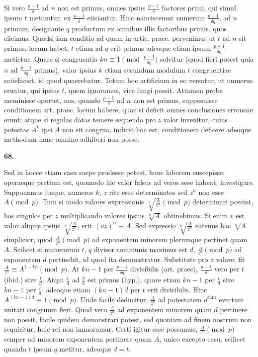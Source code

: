 \documentclass[12pt,a4paper]{article}
\theoremstyle{plain}
\theoremstyle{definition}
\theoremstyle{remark}
\begin{document}
Si vero $\frac{p-1}{\delta}$ ad $n$ non est primus, omnes ipsius $\frac{p-1}{\delta}$ factores primi, qui simul ipsum $t$ metiuntur, ex $\frac{p-1}{\delta}$ eiiciantur. Hinc nanciscemur numerum $\frac{p-1}{\delta q}$, ad $n$ primum, designante $q$ productum ex omnibus illis factoribus primis, quos eiicimus. Quodsi iam conditio ad quam in artic. praec. pervenimus ut $t$ ad $n$ sit primus, locum habet, $t$ etiam ad $q$ erit primus adeoque etiam ipsum $\frac{p-1}{\delta q}$ metietur. Quare si congruentia $kn \equiv 1 \pmod{\frac{p-1}{\delta q}}$ solvitur (quod fieri potest quia $n$ ad $\frac{p-1}{\delta q}$ primus), valor ipsius $k$ etiam secundum modulum $t$ congruentiae satisfaciet, id quod quaerebatur. Totum hoc artificium in eo versatur, ut numerus eruatur, qui ipsius $t$, quem ignoramus, vice fungi possit. Attamen probe meminisse oportet, nos, quando $\frac{p-1}{\delta}$ ad $n$ non est primus, supposuisse conditionem art. praec. locum habere, quae si deficit omnes conclusiones erroneae erunt; atque si regulas datas temere sequendo pro $z$ valor invenitur, cuius potestas $A^k$ ipsi $A$ non sit congrua, indicio hoc est, conditionem deficere adeoque methodum hanc omnino adhiberi non posse.

\setcounter{satz}{68}
\addtocounter{satz}{-1}
\textbf{68.}

Sed in hocce etiam casu saepe prodesse potest, hunc laborem suscepisse; operaeque pretium est, quomodo hic valor falsus ad veros sese habeat, investigare. Supponamus itaque, numeros $k$, $z$ rite esse determinatos sed $z^n$ non esse $A \pmod{p}$. Tum si modo valores expressionis $\sqrt[n]{\frac{A}{z^n}} \pmod{p}$ determinari possint, hos singulos per $z$ multiplicando valores ipsius $\sqrt[n]{A}$ obtinebimus. Si enim $v$ est valor aliquis ipsius $\sqrt[n]{\frac{A}{z^n}}$, erit $(vz)^n \equiv A$. Sed expressio $\sqrt[n]{\frac{A}{z^n}}$ eatenus hac $\sqrt[n]{A}$ simplicior, quod $\frac{A}{z^n} \pmod{p}$ ad exponentem minorem plerumque pertinet quam $A$. Scilicet si numerorum $t$, $q$ divisor communis maximus est $d$, $\frac{A}{z^n} \pmod{p}$ ad exponentem $d$ pertinebit, id quod ita demonstratur. Substitute pro $z$ valore, fit $\frac{A}{z^n} \equiv A^{1-kn} \pmod{p}$. At $kn-1$ per $\frac{p-1}{\delta q}$ divisibilis (art. praec), $\frac{p-1}{\delta}$ vero per $t$ (ibid.) sive $\frac{t}{d}$. Atqui $\frac{t}{d}$ ad $\frac{q}{d}$ est primus (hyp.), quare etiam $kn-1$ per $\frac{t}{d}$ sive $kn-1$ per $\frac{t}{d}$, adeoque etiam $(kn-1)d$ per $t$ erit divisibilis. Hinc $A^{(kn-1)d} \equiv 1 \pmod{p}$. Unde facile deducitur, $\frac{A}{z^n}$ ad potestatem $d^\text{tam}$ evectum unitati congruum fieri. Quod vero $\frac{A}{z^n}$ ad exponentem minorem quam $d$ pertinere non possit, facile quidem demonstrari potest, sed quoniam ad finem nostrum non requiritur, huic rei non immoramur. Certi igitur esse possumus, $\frac{A}{z^n} \pmod{p}$ semper ad minorem exponentem pertinere quam $A$, unico excepto casu, scilicet quando $t$ ipsum $q$ metitur, adeoque $d=t$.
\end{document}
